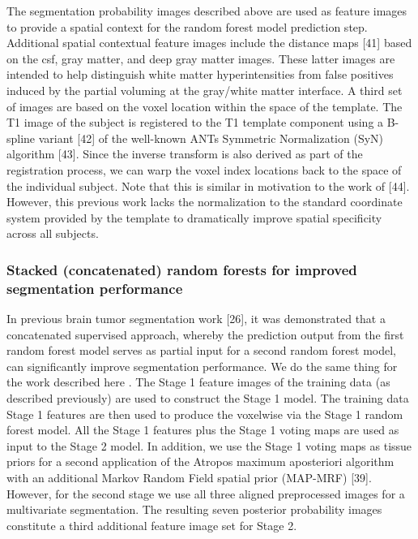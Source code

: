 \documentclass[11pt,]{article}
\begin{document}
The segmentation probability images described above are used as feature
images to provide a spatial context for the random forest model
prediction step. Additional spatial contextual feature images include
the distance maps {[}41{]} based on the csf, gray matter, and deep gray
matter images. These latter images are intended to help distinguish
white matter hyperintensities from false positives induced by the
partial voluming at the gray/white matter interface. A third set of
images are based on the voxel location within the space of the template.
The T1 image of the subject is registered to the T1 template component
using a B-spline variant {[}42{]} of the well-known ANTs Symmetric
Normalization (SyN) algorithm {[}43{]}. Since the inverse transform is
also derived as part of the registration process, we can warp the voxel
index locations back to the space of the individual subject. Note that
this is similar in motivation to the work of {[}44{]}. However, this
previous work lacks the normalization to the standard coordinate system
provided by the template to dramatically improve spatial specificity
across all subjects.

\subsubsection{Stacked (concatenated) random forests for improved
segmentation
performance}\label{stacked-concatenated-random-forests-for-improved-segmentation-performance}

In previous brain tumor segmentation work {[}26{]}, it was demonstrated
that a concatenated supervised approach, whereby the prediction output
from the first random forest model serves as partial input for a second
random forest model, can significantly improve segmentation performance.
We do the same thing for the work described here
.
The Stage 1 feature images of the training data (as described
previously) are used to construct the Stage 1 model. The training data
Stage 1 features are then used to produce the voxelwise
via the Stage 1 random forest model. All the Stage 1 features plus the
Stage 1 voting maps are used as input to the Stage 2 model. In addition,
we use the Stage 1 voting maps as tissue priors
for a second application of the Atropos maximum aposteriori algorithm
with an additional Markov Random Field spatial prior (MAP-MRF) {[}39{]}.
However, for the second stage we use all three aligned preprocessed
images for a multivariate segmentation. The resulting seven posterior
probability images constitute a third additional feature image set for
Stage 2.
\end{document}
